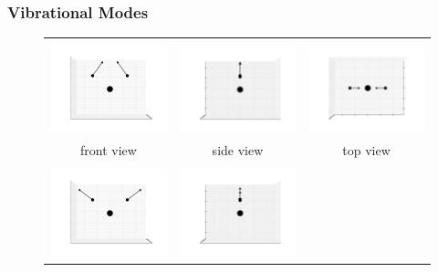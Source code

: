 \documentclass[11pt]{article}
\begin{document}
\subsubsection{Vibrational Modes}
\label{vib}
\begin{figure}[htp]
	\centering
	\begin{tabular}{|ccc|}\hline&&\\
	\includegraphics[width=5.5cm,clip=true,trim=3cm 2cm 3cm 2cm]{0-0_6.pdf}&
	\includegraphics[width=5.5cm,clip=true,trim=3cm 2cm 3cm 2cm]{0-90_6.pdf}&
	\includegraphics[width=5.5cm,clip=true,trim=3cm 2cm 3cm 2cm]{90-0_6.pdf}\\front view&side view&top view\\\hline&&\\
	\includegraphics[width=5.5cm,clip=true,trim=3cm 2cm 3cm 2cm]{0-0_7.pdf}&
	\includegraphics[width=5.5cm,clip=true,trim=3cm 2cm 3cm 2cm]{0-90_7.pdf}&

\end{tabular}
\end{figure}
\end{document}
